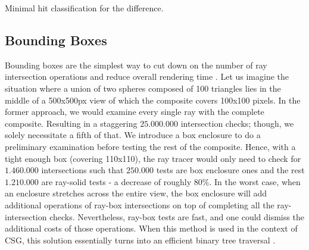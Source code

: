 \documentclass[a4paper,11pt,oneside]{article}
\begin{document}
\begin{algorithm}[H]
	\SetAlgoLined
	\caption{Minimal hit classification for the difference.}
	\label{sec4.1:difference_algo}
\end{algorithm} 


\subsection{Bounding Boxes}
\label{section:bounding-boxes-optimization}

Bounding boxes are the simplest way to cut down on the number of ray intersection operations and reduce overall rendering time \cite{efficient_csg_meshes}. Let us imagine the situation where a union of two spheres composed of 100 triangles lies in the middle of a 500x500px view of which the composite covers 100x100 pixels. In the former approach, we would examine every single ray with the complete composite. Resulting in a staggering $25.000.000$ intersection checks; though,  we solely necessitate a fifth of that. We introduce a box enclosure to do a preliminary examination before testing the rest of the composite. Hence, with a tight enough box (covering 110x110), the ray tracer would only need to check for $1.460.000$ intersections such that $250.000$ tests are box enclosure ones and the rest $1.210.000$ are ray-solid tests - a decrease of roughly $80\%$. In the worst case, when an enclosure stretches across the entire view, the box enclosure will add additional operations of ray-box intersections on top of completing all the ray-intersection checks. Nevertheless, ray-box tests are fast, and one could dismiss the additional costs of those operations. When this method is used in the context of CSG, this solution essentially turns into an efficient binary tree traversal \cite{ROTH1982109}. 
\end{document}
